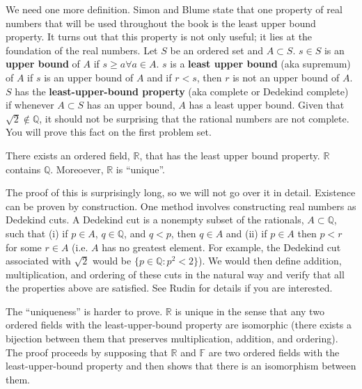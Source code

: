 We need one more definition. Simon and Blume state that one property
of real numbers that will be used throughout the book is the least
upper bound property. It turns out that this property is not only
useful; it lies at the foundation of the real numbers. Let $S$ be an
ordered set and $A \subset S$. $s \in S$ is an \textbf{upper bound} of
$A$ if $s \geq a \forall a \in A$. $s$ is a \textbf{least upper bound}
(aka supremum) of $A$ if $s$ is an upper bound of $A$ and if $r < s$,
then $r$ is not an upper bound of $A$. $S$ has the
\textbf{least-upper-bound property} (aka complete or Dedekind
complete) if whenever $A \subset S$ has an upper bound, $A$ has a
least upper bound. Given that $\sqrt{2} \not\in \mathbb{Q}$, it should
not be surprising that the rational numbers are not complete. You will
prove this fact on the first problem set. 

\begin{theorem}
  There exists an ordered field, $\mathbb{R}$, that has the least
  upper bound property. $\mathbb{R}$ contains $\mathbb{Q}$. Moreoever,
  $\mathbb{R}$ is ``unique''.
\end{theorem}

The proof of this is surprisingly long, so we will not go over it in
detail. Existence can be proven by construction. One method involves
constructing real numbers as Dedekind cuts. A Dedekind cut is a
nonempty subset of the rationals, $A \subset \mathbb{Q}$, such that
(i) if $p \in A$, $q \in \mathbb{Q}$, and $q < p$, then $q \in A$ and
(ii) if $p \in A$ then $p<r$ for some $r \in A$ (i.e. $A$ has no
greatest element. For example, the Dedekind cut associated with
$\sqrt{2}$ would be $\{p \in \mathbb{Q}: p^2 < 2\}$). We would then
define addition, multiplication, and ordering of these cuts in the
natural way and verify that all the properties above are
satisfied. See Rudin for details if you are interested.

The ``uniqueness'' is harder to prove. $\mathbb{R}$ is unique in the
sense that any two ordered fields with the least-upper-bound property
are isomorphic (there exists a bijection between them that preserves
multiplication, addition, and ordering). The proof proceeds by
supposing that $\mathbb{R}$ and $\mathbb{F}$ are two ordered fields
with the least-upper-bound property and then shows that there is an
isomorphism between them.







